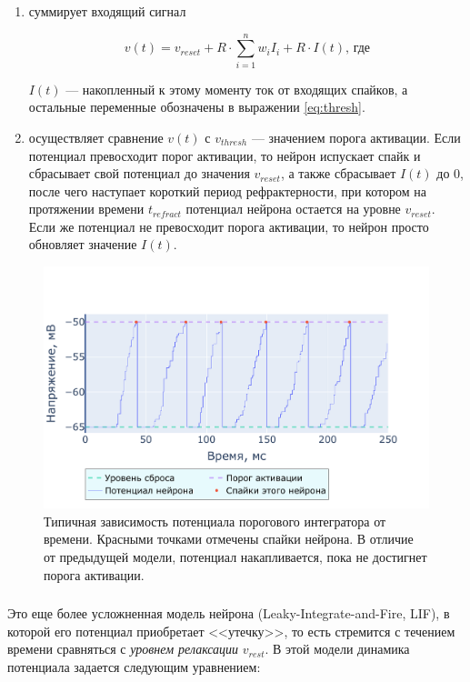 \documentclass[a4paper]{article}
\begin{document}
\begin{enumerate}
 \item суммирует входящий сигнал

\begin{equation} \label{eq:if}
v(t) = v_{reset} + R \cdot \sum_{i=1}^n {w_i I_i} + R \cdot I(t) \text{, где}
\end{equation}

$I(t)$ --- накопленный к этому моменту ток от входящих спайков, а остальные переменные обозначены в выражении \ref{eq:thresh}.

\item осуществляет сравнение $v(t)$ с $v_{thresh}$ --- значением порога активации. Если потенциал превосходит порог активации, то нейрон испускает спайк и сбрасывает свой потенциал до значения $v_{reset}$, а также сбрасывает $I(t)$ до 0, после чего наступает короткий период рефрактерности, при котором на протяжении времени $t_{refract}$ потенциал нейрона остается на уровне $v_{reset}$. Если же потенциал не превосходит порога активации, то нейрон просто обновляет значение $I(t)$.
\end{enumerate}

\begin{center}
\begin{figure}[H] 
 \includegraphics[width=\textwidth,keepaspectratio=true]{model_if_ru.pdf}
 \caption{Типичная зависимость потенциала порогового интегратора от времени. Красными точками отмечены спайки нейрона. В отличие от предыдущей модели, потенциал накапливается, пока не достигнет порога активации.}
\end{figure}
\end{center} 

\subsubsection{}
Это еще более усложненная модель нейрона (Leaky-Integrate-and-Fire, LIF), в которой его потенциал приобретает <<утечку>>, то есть стремится с течением времени сравняться с \textit{уровнем релаксации} $v_{rest}$. В этой модели динамика потенциала задается следующим уравнением:
\end{document}
